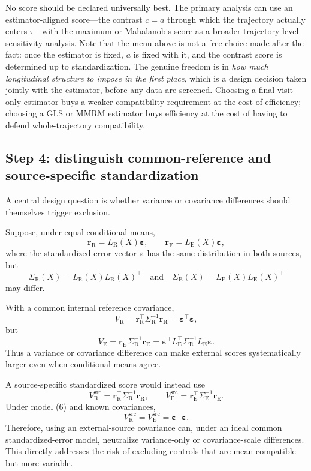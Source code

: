 \documentclass[11pt]{article}
\newcommand{\R}{\mathrm{R}}
\newcommand{\E}{\mathrm{E}}
\begin{document}
No score should be declared universally best. The primary analysis can use an estimator-aligned score---the contrast $c=a$ through which the trajectory actually enters $\widehat\tau$---with the maximum or Mahalanobis score as a broader trajectory-level sensitivity analysis. Note that the menu above is not a free choice made after the fact: once the estimator is fixed, $a$ is fixed with it, and the contrast score is determined up to standardization. The genuine freedom is in \emph{how much longitudinal structure to impose in the first place}, which is a design decision taken jointly with the estimator, before any data are screened. Choosing a final-visit-only estimator buys a weaker compatibility requirement at the cost of efficiency; choosing a GLS or MMRM estimator buys efficiency at the cost of having to defend whole-trajectory compatibility.

\subsection{Step 4: distinguish common-reference and source-specific standardization}

A central design question is whether variance or covariance differences should themselves trigger exclusion.

Suppose, under equal conditional means,
\[
\bm r_{\R}=L_{\R}(X)\bm\varepsilon,
\qquad
\bm r_{\E}=L_{\E}(X)\bm\varepsilon,
\tag{6}
\]
where the standardized error vector $\bm\varepsilon$ has the same distribution in both sources, but
\[
\Sigma_{\R}(X)=L_{\R}(X)L_{\R}(X)^{\top}
\quad\text{and}\quad
\Sigma_{\E}(X)=L_{\E}(X)L_{\E}(X)^{\top}
\]
may differ.

With a common internal reference covariance,
\[
V_{\R}=\bm r_{\R}^{\top}\Sigma_{\R}^{-1}\bm r_{\R}
=\bm\varepsilon^{\top}\bm\varepsilon,
\]
but
\[
V_{\E}=\bm r_{\E}^{\top}\Sigma_{\R}^{-1}\bm r_{\E}
=\bm\varepsilon^{\top}L_{\E}^{\top}\Sigma_{\R}^{-1}L_{\E}\bm\varepsilon.
\]
Thus a variance or covariance difference can make external scores systematically larger even when conditional means agree.

A source-specific standardized score would instead use
\[
V_{\R}^{\mathrm{src}}
=\bm r_{\R}^{\top}\Sigma_{\R}^{-1}\bm r_{\R},
\qquad
V_{\E}^{\mathrm{src}}
=\bm r_{\E}^{\top}\Sigma_{\E}^{-1}\bm r_{\E}.
\tag{7}
\]
Under model (6) and known covariances,
\[
V_{\R}^{\mathrm{src}}=V_{\E}^{\mathrm{src}}=\bm\varepsilon^{\top}\bm\varepsilon.
\]
Therefore, using an external-source covariance can, under an ideal common standardized-error model, neutralize variance-only or covariance-scale differences. This directly addresses the risk of excluding controls that are mean-compatible but more variable.
\end{document}
